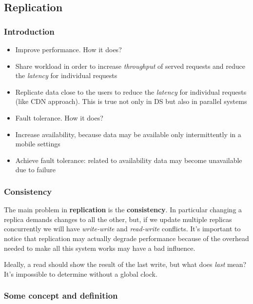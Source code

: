 \subsection{Replication}

\subsubsection{Introduction}

\begin{itemize}
    \item
      Improve performance. How it does?
    \item
      Share workload in order to increase \emph{throughput} of served
      requests and reduce the \emph{latency} for individual requests
    \item
      Replicate data close to the users to reduce the \emph{latency} for
      individual requests (like CDN approach). This is true not only in DS
      but also in parallel systems
    \item
      Fault tolerance. How it does?
    \item
      Increase availability, because data may be available only
      intermittently in a mobile settings
    \item
      Achieve fault tolerance: related to availability data may become
      unavailable due to failure
\end{itemize}

\subsubsection{Consistency}

The main problem in \textbf{replication} is the \textbf{consistency}. In
particular changing a replica demands changes to all the other, but, if
we update multiple replicas concurrently we will have \emph{write-write}
and \emph{read-write} conflicts. It's important to notice that replication 
may actually degrade performance because of the overhead needed to make all 
this system works may have a bad influence.

Ideally, a read should show the result of the last write, but what does
\emph{last} mean? It's impossible to determine without a global clock.\\

\subsubsection{Some concept and definition}

